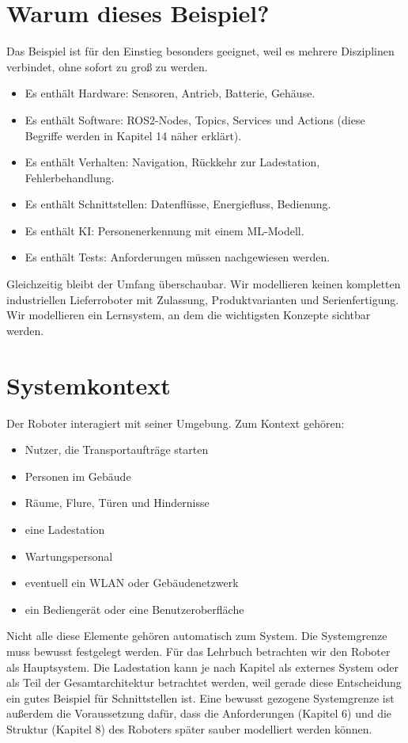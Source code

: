 \section{Warum dieses Beispiel?}
Das Beispiel ist für den Einstieg besonders geeignet, weil es mehrere Disziplinen verbindet, ohne sofort zu groß zu werden.

\begin{itemize}
    \item Es enthält Hardware: Sensoren, Antrieb, Batterie, Gehäuse.
    \item Es enthält Software: ROS2-Nodes, Topics, Services und Actions (diese Begriffe werden in Kapitel 14 näher erklärt).
    \item Es enthält Verhalten: Navigation, Rückkehr zur Ladestation, Fehlerbehandlung.
    \item Es enthält Schnittstellen: Datenflüsse, Energiefluss, Bedienung.
    \item Es enthält KI: Personenerkennung mit einem ML-Modell.
    \item Es enthält Tests: Anforderungen müssen nachgewiesen werden.
\end{itemize}

Gleichzeitig bleibt der Umfang überschaubar. Wir modellieren keinen kompletten industriellen Lieferroboter mit Zulassung, Produktvarianten und Serienfertigung. Wir modellieren ein Lernsystem, an dem die wichtigsten Konzepte sichtbar werden.

\section{Systemkontext}
Der Roboter interagiert mit seiner Umgebung. Zum Kontext gehören:

\begin{itemize}
    \item Nutzer, die Transportaufträge starten
    \item Personen im Gebäude
    \item Räume, Flure, Türen und Hindernisse
    \item eine Ladestation
    \item Wartungspersonal
    \item eventuell ein WLAN oder Gebäudenetzwerk
    \item ein Bediengerät oder eine Benutzeroberfläche
\end{itemize}

Nicht alle diese Elemente gehören automatisch zum System. Die Systemgrenze muss bewusst festgelegt werden. Für das Lehrbuch betrachten wir den Roboter als Hauptsystem. Die Ladestation kann je nach Kapitel als externes System oder als Teil der Gesamtarchitektur betrachtet werden, weil gerade diese Entscheidung ein gutes Beispiel für Schnittstellen ist. Eine bewusst gezogene Systemgrenze ist außerdem die Voraussetzung dafür, dass die Anforderungen (Kapitel 6) und die Struktur (Kapitel 8) des Roboters später sauber modelliert werden können.

